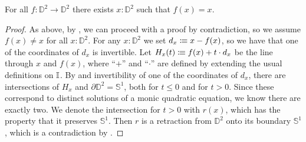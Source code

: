 \begin{theorem}
  For all $f:\mathbb{D}^2\to \mathbb{D}^2$ there exists $x:\mathbb{D}^2$ such that $f(x)=x$.
\end{theorem}

\begin{proof}
  As above, by , we can proceed with a proof by contradiction,
  so we assume $f(x)\neq x$ for all $x:\mathbb{D}^2$.
  For any $x:\mathbb{D}^2$ we set $d_x\vcentcolon\mspace{-1.2mu}\equiv x-f(x)$, so we have that one of the coordinates of $d_x$ is invertible.
  Let $H_x(t)\vcentcolon\mspace{-1.2mu}\equiv f(x) + t\cdot d_x $ be the line through $x$ and $f(x)$, where ``$+$'' and ``$\cdot$'' are defined by extending the usual definitions on $\mathbb{I}$.
  By  and invertibility of one of the coordinates of $d_x$, there are intersections of $H_x$ and $\partial\mathbb{D}^2=\mathbb{S}^1$, both for $t\leq 0$ and for $t> 0$.
  Since these correspond to distinct solutions of a monic quadratic equation, we know there are exactly two.
  We denote the intersection for $t> 0$ with $r(x)$, which has the property that it preserves $\mathbb{S}^1$.
  Then $r$ is a retraction from $\mathbb{D}^2$ onto its boundary $\mathbb{S}^1$, which is a contradiction by .
\end{proof}
